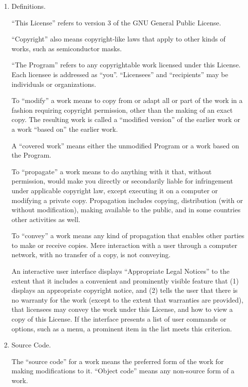 \begin{enumerate}
\addtocounter{enumi}{-1}

\item Definitions.

``This License'' refers to version 3 of the GNU General Public License.

``Copyright'' also means copyright-like laws that apply to other kinds of
works, such as semiconductor masks.

``The Program'' refers to any copyrightable work licensed under this
License.  Each licensee is addressed as ``you''.  ``Licensees'' and
``recipients'' may be individuals or organizations.

To ``modify'' a work means to copy from or adapt all or part of the work
in a fashion requiring copyright permission, other than the making of an
exact copy.  The resulting work is called a ``modified version'' of the
earlier work or a work ``based on'' the earlier work.

A ``covered work'' means either the unmodified Program or a work based
on the Program.

To ``propagate'' a work means to do anything with it that, without
permission, would make you directly or secondarily liable for
infringement under applicable copyright law, except executing it on a
computer or modifying a private copy.  Propagation includes copying,
distribution (with or without modification), making available to the
public, and in some countries other activities as well.

To ``convey'' a work means any kind of propagation that enables other
parties to make or receive copies.  Mere interaction with a user through
a computer network, with no transfer of a copy, is not conveying.

An interactive user interface displays ``Appropriate Legal Notices''
to the extent that it includes a convenient and prominently visible
feature that (1) displays an appropriate copyright notice, and (2)
tells the user that there is no warranty for the work (except to the
extent that warranties are provided), that licensees may convey the
work under this License, and how to view a copy of this License.  If
the interface presents a list of user commands or options, such as a
menu, a prominent item in the list meets this criterion.

\item Source Code.

The ``source code'' for a work means the preferred form of the work
for making modifications to it.  ``Object code'' means any non-source
form of a work.


\end{enumerate}
